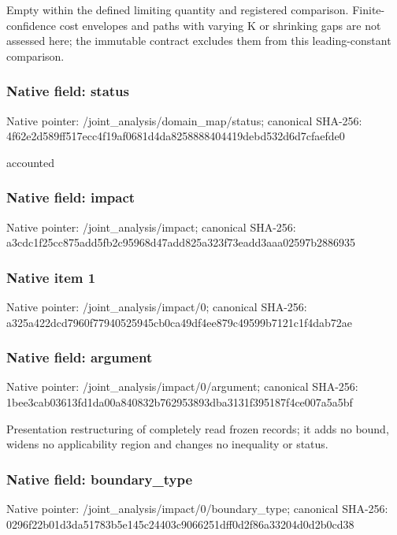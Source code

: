 \documentclass[10pt,a4paper]{article}
\begin{document}
\begingroup\raggedright\sloppy Empty within the defined limiting quantity and registered comparison. Finite-confidence cost envelopes and paths with varying K or shrinking gaps are not assessed here;\allowbreak{} the immutable contract excludes them from this leading-constant comparison.\par\endgroup

\subsubsection{Native field: status}
Native pointer: /joint\_\allowbreak{}analysis/domain\_\allowbreak{}map/status; canonical SHA-256: 4f62e2d589ff517ecc4f19af0681d4da8258888404419debd532d6d7cfaefde0

\begingroup\raggedright\sloppy accounted\par\endgroup

\subsubsection{Native field: impact}
Native pointer: /joint\_\allowbreak{}analysis/impact; canonical SHA-256: a3cdc1f25cc875add5fb2c95968d47add825a323f73eadd3aaa02597b2886935

\subsubsection{Native item 1}
Native pointer: /joint\_\allowbreak{}analysis/impact/0; canonical SHA-256: a325a422dcd7960f77940525945cb0ca49df4ee879c49599b7121c1f4dab72ae

\subsubsection{Native field: argument}
Native pointer: /joint\_\allowbreak{}analysis/impact/0/argument; canonical SHA-256: 1bee3cab03613fd1da00a840832b762953893dba3131f395187f4ce007a5a5bf

\begingroup\raggedright\sloppy Presentation restructuring of completely read frozen records;\allowbreak{} it adds no bound,\allowbreak{} widens no applicability region and changes no inequality or status.\par\endgroup

\subsubsection{Native field: boundary\_\allowbreak{}type}
Native pointer: /joint\_\allowbreak{}analysis/impact/0/boundary\_\allowbreak{}type; canonical SHA-256: 0296f22b01d3da51783b5e145c24403c9066251dff0d2f86a33204d0d2b0cd38
\end{document}
